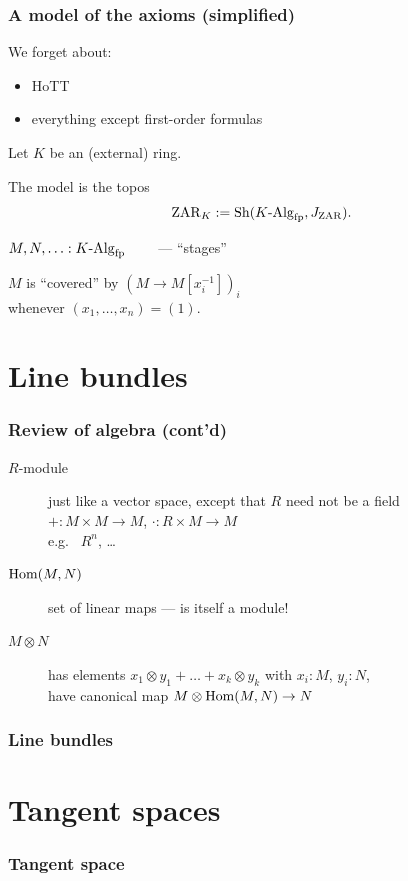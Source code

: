 \documentclass[aspectratio=1610]{beamer}
\begin{document}
\begin{frame}
  \frametitle{A model of the axioms (simplified)}

  We forget about:
  \begin{itemize}
    \item
      HoTT
    \item
      everything except first-order formulas
  \end{itemize}

  \pause%
  \bigskip
  Let $K$ be an (external) ring.

  \bigskip
  The model is the topos
  \[\mathrm{ZAR}_K := \Sh(\Alg{K}_{\mathrm{fp}}, J_{\mathrm{ZAR}}) \rlap{.}\]

  \bigskip
  $M, N, \ldots : K\text{-}\mathrm{Alg}_{\mathrm{fp}}$ $\qquad$--- \enquote{stages}

  \bigskip
  $M$ is \enquote{covered} by $(M \to M[x_i^{-1}])_i$\\
  whenever $(x_1, \dots, x_n) = (1)$.
\end{frame}

\appendix

\section{Line bundles}

\begin{frame}
  \frametitle{Review of algebra (cont'd)}

  \begin{description}
    \item[$R$-module]
      just like a vector space, except that $R$ need not be a field\\
      ${+} : M \times M \to M$, ${\cdot} : R \times M \to M$\\
      {
      e.g.\ %
      $R^n$,
      \dots}
      \pause%
    \bigskip
    \item[$\mathrm{Hom}(M, N)$]
      set of linear maps
      --- is itself a module!
      \pause%
    \bigskip
    \item[$M \otimes N$]
      has elements $x_1 \otimes y_1 + \dots + x_k \otimes y_k$ with $x_i : M$, $y_i : N$,\\
      have canonical map $M \otimes \mathrm{Hom}(M, N) \to N$
  \end{description}
\end{frame}

\begin{frame}
  \frametitle{Line bundles}
\end{frame}

\section{Tangent spaces}

\begin{frame}
  \frametitle{Tangent space}
\end{frame}
\end{document}
